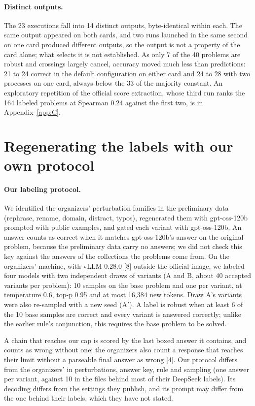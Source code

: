 \documentclass{article}
\begin{document}
\paragraph{Distinct outputs.} The 23 executions fall into 14 distinct outputs, byte-identical within each. The same output appeared on both cards, and two runs launched in the same second on one card produced different outputs, so the output is not a property of the card alone; what selects it is not established. As only 7 of the 40 problems are robust and crossings largely cancel, accuracy moved much less than predictions: 21 to 24 correct in the default configuration on either card and 24 to 28 with two processes on one card, always below the 33 of the majority constant. An exploratory repetition of the official score extraction, whose third run ranks the 164 labeled problems at Spearman 0.24 against the first two, is in Appendix~\ref{app:C}.

\section{Regenerating the labels with our own protocol}\label{sec:labels}

\paragraph{Our labeling protocol.} We identified the organizers' perturbation families in the preliminary data (rephrase, rename, domain, distract, typos), regenerated them with gpt-oss-120b prompted with public examples, and gated each variant with gpt-oss-120b. An answer counts as correct when it matches gpt-oss-120b's answer on the original problem, because the preliminary data carry no answers; we did not check this key against the answers of the collections the problems come from. On the organizers' machine, with vLLM 0.28.0 [8] outside the official image, we labeled four models with two independent draws of variants (A and B, about 40 accepted variants per problem): 10 samples on the base problem and one per variant, at temperature 0.6, top-p 0.95 and at most 16,384 new tokens. Draw A's variants were also re-sampled with a new seed (A$'$). A label is robust when at least 6 of the 10 base samples are correct and every variant is answered correctly; unlike the earlier rule's conjunction, this requires the base problem to be solved.

A chain that reaches our cap is scored by the last boxed answer it contains, and counts as wrong without one; the organizers also count a response that reaches their limit without a parseable final answer as wrong [4]. Our protocol differs from the organizers' in perturbations, answer key, rule and sampling (one answer per variant, against 10 in the files behind most of their DeepSeek labels). Its decoding differs from the settings they publish, and its prompt may differ from the one behind their labels, which they have not stated.
\end{document}
